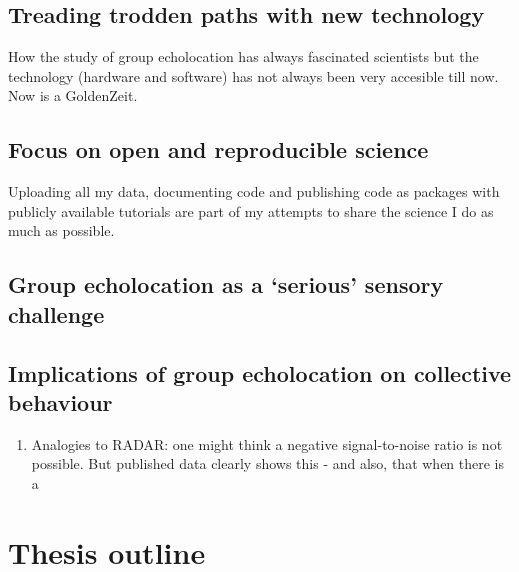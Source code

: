 \documentclass[
]{book}
\providecommand{\tightlist}{%
  \setlength{\itemsep}{0pt}\setlength{\parskip}{0pt}}
\begin{document}
\hypertarget{treading-trodden-paths-with-new-technology}{%
\subsection{Treading trodden paths with new technology}\label{treading-trodden-paths-with-new-technology}}

How the study of group echolocation has always fascinated scientists but the technology (hardware and software) has not always been very accesible till now. Now is a GoldenZeit.

\hypertarget{focus-on-open-and-reproducible-science}{%
\subsection{Focus on open and reproducible science}\label{focus-on-open-and-reproducible-science}}

Uploading all my data, documenting code and publishing code as packages with publicly available tutorials are part of my attempts to share the science I do as much as possible.

\hypertarget{group-echolocation-as-a-serious-sensory-challenge}{%
\subsection{Group echolocation as a `serious' sensory challenge}\label{group-echolocation-as-a-serious-sensory-challenge}}

\hypertarget{implications-of-group-echolocation-on-collective-behaviour}{%
\subsection{Implications of group echolocation on collective behaviour}\label{implications-of-group-echolocation-on-collective-behaviour}}

\begin{enumerate}
\def\labelenumi{\arabic{enumi}.}
\tightlist
\item
  Analogies to RADAR: one might think a negative signal-to-noise ratio is not possible. But published data clearly shows this - and also, that when there is a
\end{enumerate}

\hypertarget{thesis-outline}{%
\section{Thesis outline}\label{thesis-outline}}
\end{document}
